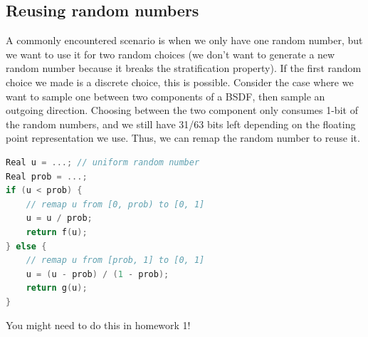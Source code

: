 \documentclass{article}
\begin{document}
\subsection{Reusing random numbers}
A commonly encountered scenario is when we only have one random number, but we want to use it for two random choices (we don't want to generate a new random number because it breaks the stratification property). If the first random choice we made is a discrete choice, this is possible. Consider the case where we want to sample one between two components of a BSDF, then sample an outgoing direction. Choosing between the two component only consumes 1-bit of the random numbers, and we still have 31/63 bits left depending on the floating point representation we use. Thus, we can remap the random number to reuse it. 
\begin{lstlisting}[language=c++]
Real u = ...; // uniform random number
Real prob = ...;
if (u < prob) {
    // remap u from [0, prob) to [0, 1]
    u = u / prob;
    return f(u);
} else {
    // remap u from [prob, 1] to [0, 1]
    u = (u - prob) / (1 - prob);
    return g(u);
}
\end{lstlisting}

You might need to do this in homework 1!
\end{document}
